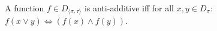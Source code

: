 %
A function $f\in D_{\langle\sigma,\tau\rangle}$ is anti-additive iff for all $x,y\in D_\sigma$:\\ $f(x\lor y)\Leftrightarrow(f(x)\land f(y))$.%

